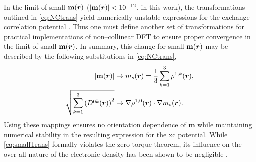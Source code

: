 In the limit of small $\mathbf{m}(\boldsymbol{r})$ ($\lvert \mathbf{m}(\boldsymbol{r}) \rvert <
10^{-12}$, in this work), the transformations outlined in \cref{eq:NCtrans}
yield numerically unstable expressions for the exchange correlation
potential \cite{Li17_2591}. Thus one must define another set of transformations
for practical implementations of non--collinear DFT to ensure proper
convergence in the limit of small $\mathbf{m}(\boldsymbol{r})$. In summary, this change
for small $\mathbf{m}(\boldsymbol{r})$ may be described by the following substitutions
in \cref{eq:NCtrans},
\begin{subequations}
  \label{eq:smallTrans}
\begin{align}
  \vert \mathbf{m}(\boldsymbol{r}) \vert   &\mapsto m_s(\boldsymbol{r}) = \frac{1}{3}\sum_{k=1}^3 \rho^{1,k}(\boldsymbol{r}),\\
  \sqrt{ \sum_{k=1}^3 \left( D^{0k} (\boldsymbol{r}) \right)^2} &\mapsto \nabla \rho^{1,0}(\boldsymbol{r}) \cdot \nabla m_s(\boldsymbol{r}).
\end{align}
\end{subequations}
Using these mappings ensures no orientation dependence of $\mathbf{m}$ while maintaining numerical stability
in the resulting expression for the xc potential. While \cref{eq:smallTrans} formally violates the zero
torque theorem, its influence on the over all nature of the electronic density has been shown to be 
negligible \cite{Li17_2591}.

